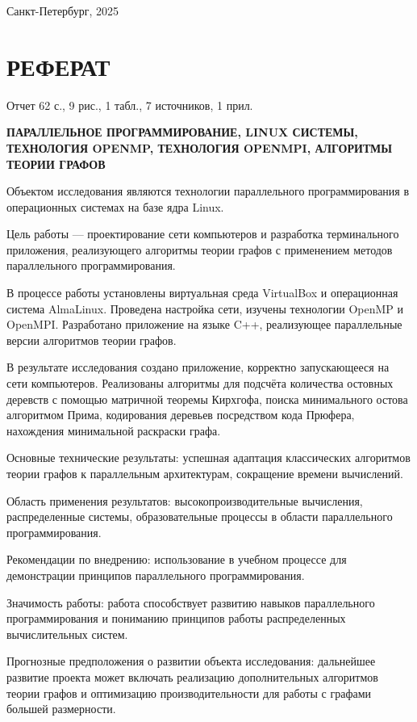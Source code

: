 \documentclass[11pt,a4paper,final]{article}
\begin{document}
	\hfill \break
	\hfill \break
	\begin{center} \small{Санкт-Петербург, 2025} \end{center}
	\thispagestyle{empty}
	

\newpage
\section*{РЕФЕРАТ}

Отчет 62 с., 9 рис., 1 табл., 7 источников, 1 прил.

\textbf{ПАРАЛЛЕЛЬНОЕ ПРОГРАММИРОВАНИЕ, LINUX СИСТЕМЫ, ТЕХНОЛОГИЯ OPENMP, ТЕХНОЛОГИЯ OPENMPI, АЛГОРИТМЫ ТЕОРИИ ГРАФОВ}

Объектом исследования являются технологии параллельного программирования в операционных системах на базе ядра Linux.

Цель работы — проектирование сети компьютеров и разработка терминального приложения, реализующего алгоритмы теории графов с применением методов параллельного программирования.

В процессе работы установлены виртуальная среда VirtualBox и операционная система AlmaLinux. Проведена настройка сети, изучены технологии OpenMP и OpenMPI. Разработано приложение на языке C++, реализующее параллельные версии алгоритмов теории графов.

В результате исследования создано приложение, корректно запускающееся на сети компьютеров. Реализованы алгоритмы для подсчёта количества остовных деревств с помощью матричной теоремы Кирхгофа, поиска минимального остова алгоритмом Прима, кодирования деревьев посредством кода Прюфера, нахождения минимальной раскраски графа.

Основные технические результаты: успешная адаптация классических алгоритмов теории графов к параллельным архитектурам, сокращение времени вычислений.

Область применения результатов: высокопроизводительные вычисления, распределенные системы, образовательные процессы в области параллельного программирования.

Рекомендации по внедрению: использование в учебном процессе для демонстрации принципов параллельного программирования.

Значимость работы: работа способствует развитию навыков параллельного программирования и пониманию принципов работы распределенных вычислительных систем.

Прогнозные предположения о развитии объекта исследования: дальнейшее развитие проекта может включать реализацию дополнительных алгоритмов теории графов и оптимизацию производительности для работы с графами большей размерности.
\end{document}
